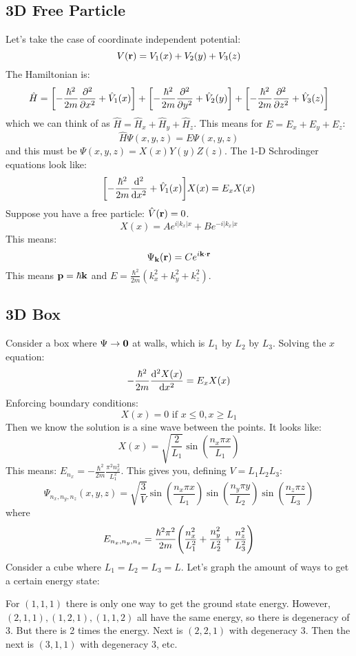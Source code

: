 \subsection{3D Free Particle}
Let's take the case of coordinate independent potential:
\[ V(\mathbf{r}) = V_1(x) + V_2(y) + V_3(z) \]
The Hamiltonian is:
\[ \hat{H} = \qty[-\frac{\hbar^2}{2m} \pdv{^2}{x^2} + \hat{V}_1(x)] + \qty[-\frac{\hbar^2}{2m} \pdv{^2}{y^2} + \hat{V}_2(y)] + \qty[-\frac{\hbar^2}{2m} \pdv{^2}{z^2} + \hat{V}_3(z)]\]
which we can think of as $\hat{H} = \hat{H}_x + \hat{H}_y + \hat{H}_z$. This means for $E = E_x + E_y + E_z$:
\[ \hat{H}\Psi(x, y, z) = E\Psi(x, y, z) \]
and this must be $\Psi(x, y, z) = X(x) Y(y) Z(z)$. The 1-D Schrodinger equations look like:
\[ \qty[-\frac{\hbar^2}{2m} \dv{^2}{x^2} + \hat{V}_1(x)] X(x) = E_x X(x) \]
Suppose you have a free particle: $\hat{V}(\mathbf{r}) = 0$.
\[ X(x) = Ae^{i |k_x| x} + Be^{-i|k_x| x} \]
This means:
\[ \Psi_{\mathbf{k}}(\mathbf{r}) = Ce^{i \mathbf{k} \cdot \mathbf{r}} \]
This means $\mathbf{p} = \hbar \mathbf{k}$ and $E = \frac{\hbar^2}{2m}(k_x^2 + k_y^2 + k_z^2)$.

\subsection{3D Box}
Consider a box where $\Psi \to \mathbf{0}$ at walls, which is $L_1$ by $L_2$ by $L_3$. Solving the $x$ equation:
\[ -\frac{\hbar^2}{2m} \dv{^2X(x)}{x^2} = E_x X(x) \]
Enforcing boundary conditions:
\[ X(x) = 0 \text{ if } x \leq 0, x \geq L_1 \]
Then we know the solution is a sine wave between the points. It looks like:
\[ X(x) = \sqrt{\frac{2}{L_1}} \sin(\frac{n_x \pi x}{L_1})\]
This means: $E_{n_x} = -\frac{\hbar^2}{2m} \frac{\pi^2 n_x^2}{L_1^2}$. This gives you, defining $V = L_1 L_2 L_3$:
\[ \Psi_{n_x, n_y, n_z}(x, y, z) = \sqrt{\frac{3}{V}} \sin(\frac{n_x \pi x}{L_1}) \sin(\frac{n_y \pi y}{L_2}) \sin(\frac{n_z \pi z}{L_3}) \]
where
\[ E_{n_x, n_y, n_z} = \frac{\hbar^2 \pi^2}{2m}\qty(\frac{n_x^2}{L_1^2} + \frac{n_y^2}{L_2^2} + \frac{n_z^2}{L_3^2}) \]
Consider a cube where $L_1 = L_2 = L_3 = L$. Let's graph the amount of ways to get a certain energy state:

For $(1, 1, 1)$ there is only one way to get the ground state energy. However, $(2, 1, 1), (1, 2, 1), (1, 1, 2)$ all have the same energy,
so there is degeneracy of 3. But there is 2 times the energy. Next is $(2, 2, 1)$ with degeneracy 3. Then the next is $(3, 1, 1)$ with degeneracy 3, etc.
